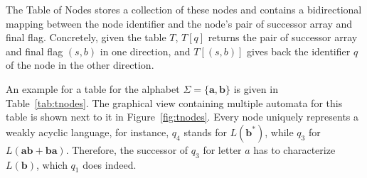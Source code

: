 \par

The Table of Nodes stores a collection of these nodes and contains a bidirectional mapping between the node identifier and the node's pair of successor array and final flag. Concretely, given the table $T$, $T[q]$ returns the pair of successor array and final flag $(s,b)$ in one direction, and $T[(s,b)]$ gives back the identifier $q$ of the node in the other direction. 

\par

An example for a table for the alphabet $\Sigma = \{ \bm{a},\bm{b}\}$ is given in Table~\ref{tab:tnodes}. The graphical view containing multiple automata for this table is shown next to it in Figure~\ref{fig:tnodes}. Every node uniquely represents a weakly acyclic language, for instance, $q_{4}$ stands for $L(\bm{b^{*}})$, while $q_{3}$ for $L(\bm{ab+ba})$. Therefore, the successor of $q_{3}$ for letter $a$ has to characterize $L(\bm{b})$, which $q_{1}$ does indeed.

